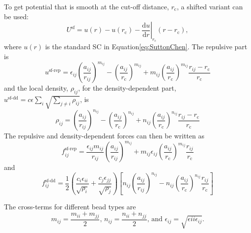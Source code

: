 To get potential that is smooth at the cut-off distance, $r_\text{c}$, a
shifted variant can be used:
\begin{equation}
U^\text{sf}=u(r)-u(r_\text{c})
  -\left.\frac{\text{d}u}{\text{d}r}\right|_{r_\text{c}}(r-r_\text{c}),
\end{equation}
where $u(r)$ is the standard SC in Equation\eqref{eq:SuttonChen}. The repulsive
part is
\begin{equation}
u^\text{sf-rep} = \epsilon_{ij}\left(\frac{a_{ij}}{r_{ij}}\right)^{m_{ij}}
  -\left(\frac{a_{ij}}{r_\text{c}}\right)^{m_{ij}}
  +m_{ij}\left(\frac{a_{ij}}{r_\text{c}}\right)^{m_{ij}}\frac{r_{ij}-r_\text{c}}{r_\text{c}}
\end{equation}
and the local density, $\rho_{ij}$, for the density-dependent part,
$u^\text{sf-dd}=c\epsilon\sum_i\sqrt{\sum_{j\neq i}\rho_{ij}}$, is
\begin{equation}
\rho_{ij} = \left(\frac{a_{ij}}{r_{ij}}\right)^{n_{ij}}
  -\left(\frac{a_{ij}}{r_\text{c}}\right)^{n_{ij}}
  +n_{ij}\left(\frac{a_{ij}}{r_\text{c}}\right)^{n_{ij}}\frac{r_{ij}-r_\text{c}}{r_\text{c}}
\end{equation}
The repulsive and density-dependent forces can then be written as
\begin{equation}
f^\text{sf-rep}_{ij} =
  \frac{\epsilon_{ij}m_{ij}}{r_{ij}}\left(\frac{a_{ij}}{r_{ij}}\right)^{m_{ij}}
  +m_{ij}\epsilon_{ij}\left(\frac{a_{ij}}{r_\text{c}}\right)^{m_{ij}}\frac{r_{ij}}{r_\text{c}}
\end{equation}
and
\begin{equation}
f^\text{sf-dd}_{ij} = 
  \frac{1}{2}\left(\frac{c_i\epsilon_{ii}}{\sqrt{\rho_i}}+\frac{c_j\epsilon_{jj}}{\sqrt{\rho_j}}\right)
\left[n_{ij}\left(\frac{a_{ij}}{r_{ij}}\right)^{n_{ij}}
-n_{ij}\left(\frac{a_{ij}}{r_\text{c}}\right)^{n_{ij}}\frac{r_{ij}}{r_\text{c}}\right]
\end{equation}

The cross-terms for different bead types are
\begin{equation}
  m_{ij} = \frac{m_{ii} + m_{jj}}{2}\text{, }
  n_{ij} = \frac{n_{ii} + n_{jj}}{2}\text{, and }
  \epsilon_{ij} = \sqrt{\epsilon{ii}\epsilon_{ij}}.
\end{equation}

